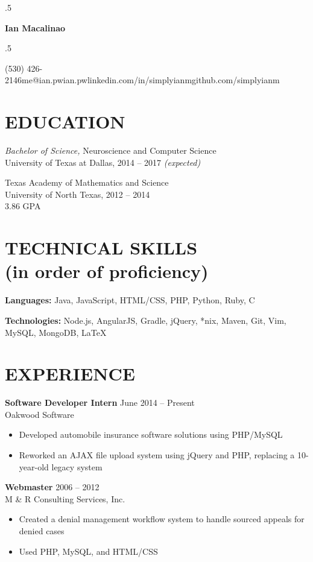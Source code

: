 \documentclass[margin, 10pt]{res} %
\newcommand*{\its}{\hspace{0.8cm}}
\begin{document}
\moveleft.5\hoffset\centerline{\Huge\bf Ian Macalinao}
\bigskip
\moveleft.5\hoffset\centerline{(530) 426-2146\its{}me@ian.pw\its{}ian.pw\its{}linkedin.com/in/simplyianm\its{}github.com/simplyianm}

\begin{resume}

  \section{EDUCATION}

  {\sl Bachelor of Science,} Neuroscience and Computer Science \\
  University of Texas at Dallas, 2014 -- 2017 \textit{(expected)}
  \medskip

  Texas Academy of Mathematics and Science \\
  University of North Texas, 2012 -- 2014 \\
  3.86 GPA

  \section{TECHNICAL SKILLS \\ \textnormal{(in order of proficiency)}} 

  {\bf Languages:} Java, JavaScript, HTML/CSS, PHP, Python, Ruby, C

  {\bf Technologies:} Node.js, AngularJS, Gradle, jQuery, *nix, Maven, Git, Vim, MySQL, MongoDB, \LaTeX

  \section{EXPERIENCE}

  {\bf Software Developer Intern} \hfill June 2014 -- Present \\
  Oakwood Software

  \begin{itemize} \itemsep -2pt
    \item Developed automobile insurance software solutions using PHP/MySQL
    \item Reworked an AJAX file upload system using jQuery and PHP, replacing a 10-year-old legacy system
  \end{itemize}

  {\bf Webmaster} \hfill 2006 -- 2012 \\
  M \& R Consulting Services, Inc.
  \begin{itemize} \itemsep -2pt
    \item Created a denial management workflow system to handle sourced appeals for denied cases
    \item Used PHP, MySQL, and HTML/CSS
  \end{itemize} 


\end{resume}
\end{document}
